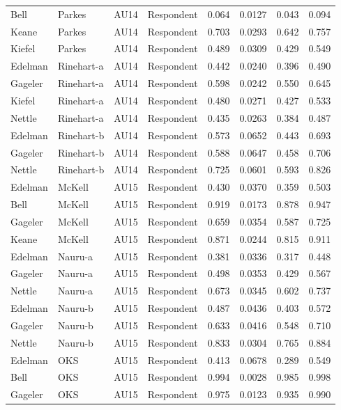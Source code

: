 \documentclass{monashthesis}
\begin{document}
\begin{center}
\begin{longtable}{llllllll}
Bell & Parkes & AU14 & Respondent & 0.064 & 0.0127 & 0.043 & 0.094 \\
Keane & Parkes & AU14 & Respondent & 0.703 & 0.0293 & 0.642 & 0.757 \\
Kiefel & Parkes & AU14 & Respondent & 0.489 & 0.0309 & 0.429 & 0.549 \\
Edelman & Rinehart-a & AU14 & Respondent & 0.442 & 0.0240 & 0.396 & 0.490 \\
Gageler & Rinehart-a & AU14 & Respondent & 0.598 & 0.0242 & 0.550 & 0.645 \\
Kiefel & Rinehart-a & AU14 & Respondent & 0.480 & 0.0271 & 0.427 & 0.533 \\
Nettle & Rinehart-a & AU14 & Respondent & 0.435 & 0.0263 & 0.384 & 0.487 \\
Edelman & Rinehart-b & AU14 & Respondent & 0.573 & 0.0652 & 0.443 & 0.693 \\
Gageler & Rinehart-b & AU14 & Respondent & 0.588 & 0.0647 & 0.458 & 0.706 \\
Nettle & Rinehart-b & AU14 & Respondent & 0.725 & 0.0601 & 0.593 & 0.826 \\
Edelman & McKell & AU15 & Respondent & 0.430 & 0.0370 & 0.359 & 0.503 \\
Bell & McKell & AU15 & Respondent & 0.919 & 0.0173 & 0.878 & 0.947 \\
Gageler & McKell & AU15 & Respondent & 0.659 & 0.0354 & 0.587 & 0.725 \\
Keane & McKell & AU15 & Respondent & 0.871 & 0.0244 & 0.815 & 0.911 \\
Edelman & Nauru-a & AU15 & Respondent & 0.381 & 0.0336 & 0.317 & 0.448 \\
Gageler & Nauru-a & AU15 & Respondent & 0.498 & 0.0353 & 0.429 & 0.567 \\
Nettle & Nauru-a & AU15 & Respondent & 0.673 & 0.0345 & 0.602 & 0.737 \\
Edelman & Nauru-b & AU15 & Respondent & 0.487 & 0.0436 & 0.403 & 0.572 \\
Gageler & Nauru-b & AU15 & Respondent & 0.633 & 0.0416 & 0.548 & 0.710 \\
Nettle & Nauru-b & AU15 & Respondent & 0.833 & 0.0304 & 0.765 & 0.884 \\
Edelman & OKS & AU15 & Respondent & 0.413 & 0.0678 & 0.289 & 0.549 \\
Bell & OKS & AU15 & Respondent & 0.994 & 0.0028 & 0.985 & 0.998 \\
Gageler & OKS & AU15 & Respondent & 0.975 & 0.0123 & 0.935 & 0.990 \\

\end{longtable}
\end{center}
\end{document}
